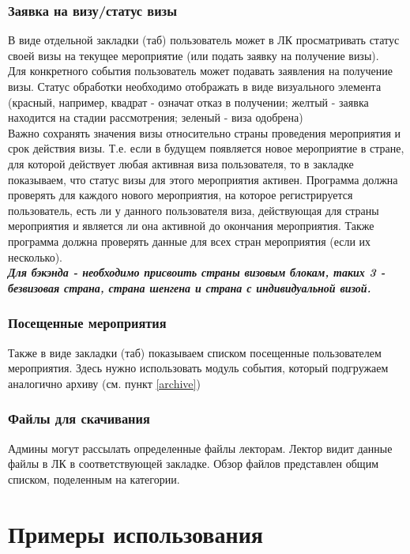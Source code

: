 \documentclass[DIV=calc, paper=a4, fontsize=11pt]{scrartcl} %
\begin{document}
\subsubsection{Заявка на визу/статус визы}
В виде отдельной закладки (таб) пользователь может в ЛК просматривать статус своей визы на текущее мероприятие (или подать заявку на получение визы).
\\[0.5cm]
Для конкретного события пользователь может подавать заявления на получение визы. Статус обработки необходимо отображать в виде визуального элемента (красный, например, квадрат - означат отказ в получении; желтый - заявка находится на стадии рассмотрения; зеленый - виза одобрена)
\\[0.5cm]
Важно сохранять значения визы относительно страны проведения мероприятия и срок действия визы. Т.е. если в будущем появляется новое мероприятие в стране, для которой действует любая активная виза пользователя, то в закладке показываем, что статус визы для этого мероприятия активен. Программа должна проверять для каждого нового мероприятия, на которое регистрируется пользователь, есть ли у данного пользователя виза, действующая для страны мероприятия и является ли она активной до окончания мероприятия. Также программа должна проверять данные для всех стран мероприятия (если их несколько).
\\[0.5cm]
\textbf{\textit{Для бэкэнда - необходимо присвоить страны визовым блокам, таких 3 - безвизовая страна, страна шенгена и страна с индивидуальной визой.}}
\subsubsection{Посещенные мероприятия}
Также в виде закладки (таб) показываем списком посещенные пользователем мероприятия. Здесь нужно использовать модуль события, который подгружаем аналогично архиву (см. пункт \ref{archive})

\subsubsection{Файлы для скачивания}
Админы могут рассылать определенные файлы лекторам. Лектор видит данные файлы в ЛК в соответствующей закладке. Обзор файлов представлен общим списком, поделенным на категории.


\section{Примеры использования}
\end{document}

